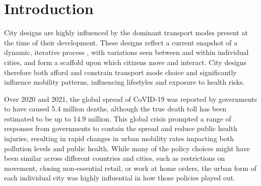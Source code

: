 \documentclass[preprint,12pt]{elsarticle}
\begin{document}
\begin{frontmatter}









\end{frontmatter}



\section*{Introduction}

City designs are highly influenced by the dominant transport modes present at the time of their development\cite{KNOWLES2020102607}. These designs reflect a current snapshot of a dynamic, iterative process \cite{Strano2012}, with variations seen between and within individual cities, and form a scaffold upon which citizens move and interact\cite{Thompson2020}. City designs therefore both afford and constrain transport mode choice and significantly influence mobility patterns, influencing lifestyles and exposure to health risks\cite{WHO2023}.

Over 2020 and 2021, the global spread of CoVID-19 was reported by governments to have caused 5.4 million deaths, although the true death toll has been estimated to be up to 14.9 million\cite{Taylor2022}. This global crisis prompted a range of responses from governments\cite{Hunter2023LPH} to contain the spread and reduce public health injuries, resulting in rapid changes in urban mobility rates impacting both pollution levels and public health. While many of the policy choices\cite{hale2021global} might have been similar across different countries and cities, such as restrictions on movement, closing non-essential retail, or work at home orders, the urban form of each individual city was highly influential in how those policies played out.
\end{document}
